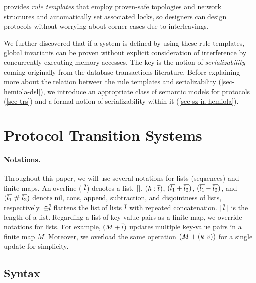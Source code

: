\documentclass[sigplan,10pt,review,anonymous,screen]{acmart}\settopmatter{printfolios=true,printccs=false,printacmref=false}
\begin{document}
\hemiola{} provides \emph{rule templates} that employ proven-safe topologies and network structures and automatically set associated locks, so designers can design protocols without worrying about corner cases due to interleavings.

We further discovered that if a system is defined by using these rule templates, global invariants can be proven without explicit consideration of interference by concurrently executing memory accesses.
The key is the notion of \emph{serializability} coming originally from the database-transactions literature.
Before explaining more about the relation between the rule templates and serializability (\autoref{sec-hemiola-dsl}), we introduce an appropriate class of semantic models for protocols (\autoref{sec-trs}) and a formal notion of serializability within it (\autoref{sec-sz-in-hemiola}).

\section{Protocol Transition Systems}
\label{sec-trs}

\paragraph{Notations.}
Throughout this paper, we will use several notations for lists (sequences) and finite maps.
An overline (\eg{} $\overline{l}$) denotes a list.
$\lbrack\rbrack{}$, $(h : \overline{t})$, $(\overline{l_1} + \overline{l_2})$, $(\overline{l_1} - \overline{l_2})$, and
$(\overline{l_1} \; \# \; \overline{l_2})$ denote nil, cons, append, subtraction, and disjointness of lists, respectively.
$\oplus \overline{l}$ flattens the list of lists $\overline{l}$ with repeated concatenation.
$|\, \overline{l}\, |$ is the length of a list.
Regarding a list of key-value pairs as a finite map, we override notations for lists.
For example, $(M + \overline{l})$ updates multiple key-value pairs in a finite map $M$.
Moreover, we overload the same operation $(M + (k, v))$ for a single update for simplicity.

\subsection{Syntax}
\label{sec-syntax}
\end{document}
